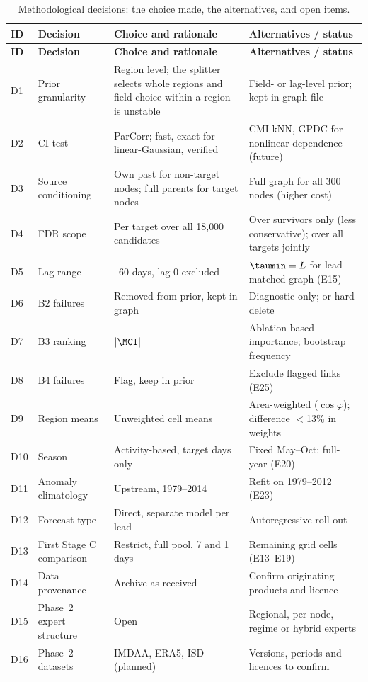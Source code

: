 \begin{small}
\renewcommand{\arraystretch}{1.2}
\begin{longtable}{>{\raggedright\arraybackslash}p{0.7cm}>{\raggedright\arraybackslash}p{3.8cm}>{\raggedright\arraybackslash}p{5.2cm}>{\raggedright\arraybackslash}p{4.5cm}}
\caption{Methodological decisions: the choice made, the alternatives, and open items.}\label{tab:decisions}\\
\toprule
\textbf{ID} & \textbf{Decision} & \textbf{Choice and rationale} & \textbf{Alternatives / status} \\
\midrule
\endfirsthead
\toprule
\textbf{ID} & \textbf{Decision} & \textbf{Choice and rationale} & \textbf{Alternatives / status} \\
\midrule
\endhead
\bottomrule
\endfoot
D1 & Prior granularity & Region level; the splitter selects whole regions and field choice within a region is unstable & Field- or lag-level prior; kept in graph file \\
D2 & CI test & ParCorr; fast, exact for linear-Gaussian, verified & CMI-kNN, GPDC for nonlinear dependence (future) \\
D3 & Source conditioning & Own past for non-target nodes; full parents for target nodes & Full graph for all 300 nodes (higher cost) \\
D4 & FDR scope & Per target over all 18{,}000 candidates & Over survivors only (less conservative); over all targets jointly \\
D5 & Lag range & 1--60 days, lag 0 excluded & $\taumin=L$ for lead-matched graph (E15) \\
D6 & B2 failures & Removed from prior, kept in graph & Diagnostic only; or hard delete \\
D7 & B3 ranking & $|\MCI|$ & Ablation-based importance; bootstrap frequency \\
D8 & B4 failures & Flag, keep in prior & Exclude flagged links (E25) \\
D9 & Region means & Unweighted cell means & Area-weighted ($\cos\varphi$); difference $<$13\% in weights \\
D10 & Season & Activity-based, target days only & Fixed May--Oct; full-year (E20) \\
D11 & Anomaly climatology & Upstream, 1979--2014 & Refit on 1979--2012 (E23) \\
D12 & Forecast type & Direct, separate model per lead & Autoregressive roll-out \\
D13 & First Stage C comparison & Restrict, full pool, 7 and 1 days & Remaining grid cells (E13--E19) \\
D14 & Data provenance & Archive as received & Confirm originating products and licence \\
D15 & Phase~2 expert structure & Open & Regional, per-node, regime or hybrid experts \\
D16 & Phase~2 datasets & IMDAA, ERA5, ISD (planned) & Versions, periods and licences to confirm \\
\end{longtable}
\end{small}
